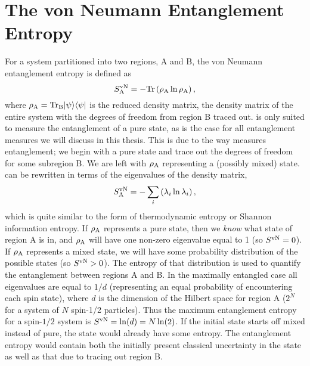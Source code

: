\section{The von Neumann Entanglement Entropy}
For a system partitioned into two regions, A and B, the von Neumann entanglement entropy \vn is defined as
\begin{equation}
	S^{\text{vN}}_\text{A} = -\rm{Tr}\left({\rho_A \ln \rho_A}\right),
\end{equation}
where $\rho_{\rm{A}}=\rm{Tr}_B\lvert {\psi} \rangle\langle {\psi} \rvert$ is the reduced density matrix, the density matrix of the entire system with the degrees of freedom from region B traced out.
\vn is only suited to measure the entanglement of a pure state, as is the case for all entanglement measures we will discuss in this thesis.
This is due to the way \vn measures entanglement; we begin with a pure state and trace out the degrees of freedom for some subregion B.  
We are left with $\rho_{\rm A}$ representing a (possibly mixed) state.
\vn can be rewritten in terms of the eigenvalues of the density matrix,
\begin{equation}
S^{\text{vN}}_\text{A} = -\sum_i \left(\lambda_i \ln \lambda_i\right),
\end{equation}
which is quite similar to the form of thermodynamic entropy or Shannon information entropy. If $\rho_{\rm A}$ represents a pure state, then we {\it know} what state of region A is in, and $\rho_{\rm A}$ will have one non-zero eigenvalue equal to 1 (so $S^{\text{vN}} = 0$).
If $\rho_{\rm A}$ represents a mixed state, we will have some probability distribution of the possible states (so $S^{\text{vN}} > 0$). The entropy of that distribution is used to quantify the entanglement between regions A and B.
In the maximally entangled case all eigenvalues are equal to $1/d$ (representing an equal probability of encountering each spin state), where $d$ is the dimension of the Hilbert space for region A ($2^N$ for a system of $N$ spin-1/2 particles). Thus the maximum entanglement entropy for a spin-$1/2$ system is $S^{\text{vN}}= \ln (d) = N \ln(2)$. 
If the initial state starts off mixed instead of pure, the state would already have some entropy. The entanglement entropy would contain both the initially present classical uncertainty in the state as well as that due to tracing out region B.

